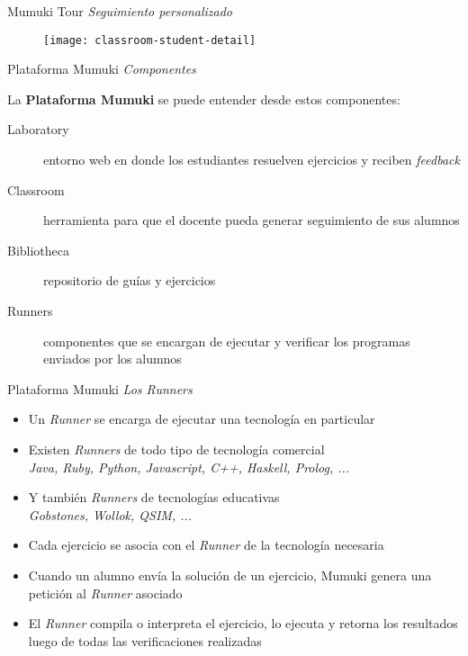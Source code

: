 \documentclass{beamer}
\begin{document}
\begin{frame}
    {Mumuki Tour}
    {\emph{Seguimiento personalizado}}

    \begin{figure}[h]
        \texttt{[image: classroom-student-detail]}
    \end{figure}
\end{frame}

\begin{frame}
    {Plataforma Mumuki}
    {\emph{Componentes}}

    La \textbf{Plataforma Mumuki} se puede entender desde estos componentes:

    \vspace{1.5em}

    \begin{description}
        \item[Laboratory] entorno web en donde los estudiantes resuelven ejercicios
        y reciben \emph{feedback}
        \item[Classroom] herramienta para que el docente pueda generar seguimiento de sus alumnos
        \item[Bibliotheca] repositorio de guías y ejercicios
        \item[Runners] componentes que se encargan de ejecutar y verificar los programas enviados por los alumnos
    \end{description}


\end{frame}


\begin{frame}
    {Plataforma Mumuki}
    {\emph{Los Runners}}

    \begin{itemize}
        \item Un \emph{Runner} se encarga de ejecutar una tecnología en particular
        \item Existen \emph{Runners} de todo tipo de tecnología comercial \\
        {\footnotesize\emph{Java, Ruby, Python, Javascript, C++, Haskell, Prolog, ...}}
        \item Y también \emph{Runners} de tecnologías educativas \\
        {\footnotesize\emph{Gobstones, Wollok, QSIM, ...}}
        \item Cada ejercicio se asocia con el \emph{Runner} de la tecnología necesaria
        \item Cuando un alumno envía la solución de un ejercicio, Mumuki
        genera una petición al \emph{Runner} asociado
        \item El \emph{Runner} compila o interpreta el ejercicio, lo ejecuta y retorna
        los resultados luego de todas las verificaciones realizadas
    \end{itemize}
\end{frame}
\end{document}

